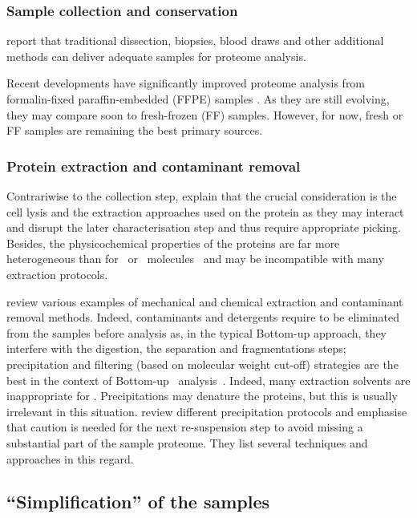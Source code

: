 \subsubsection{Sample collection and conservation}
\citet{Feist2015} report that traditional dissection, biopsies, blood draws and
other additional methods can deliver adequate samples for proteome analysis.

Recent developments have significantly improved proteome analysis from
formalin-fixed paraffin-embedded (\gls{FFPE}) samples .
As they are still evolving,
they may compare soon to fresh-frozen (\gls{FF}) samples.
However, for now, fresh or \gls{FF} samples are remaining the best primary sources.

\subsubsection{Protein extraction and contaminant removal}
Contrariwise to the collection step, \citet{Feist2015} explain that the crucial
consideration is the cell lysis and the extraction approaches used on
the protein as they may interact and disrupt the later characterisation step and
thus require appropriate picking. Besides, the physicochemical properties of
the proteins are far more heterogeneous than for \DNA\ or \RNA\ molecules~
and may be incompatible with many extraction protocols.

\citet{Gutstein2008,Bodzon-Kulakowska2007,Visser2005,Hilbrig2003} review various
examples of mechanical and chemical extraction and contaminant removal methods.
Indeed, contaminants and detergents require to be eliminated from the samples
before analysis as, in the typical \gls{Bottom-up} approach, they interfere
with the digestion, the separation and fragmentations steps; precipitation and
filtering (based on molecular weight cut-off) strategies are the best in the
context of \gls{Bottom-up} \ms\ analysis~. Indeed, many
extraction solvents are inappropriate for \ms. Precipitations may denature the
proteins, but this is usually irrelevant in this situation.
\citet{Feist2015} review different precipitation protocols
and emphasise that caution is needed
for the next re-suspension step to avoid missing a substantial part of the
sample proteome. They list several techniques and approaches in this regard.

\subsection{\enquote{Simplification} of the samples}\label{subsec:simpleProt}

